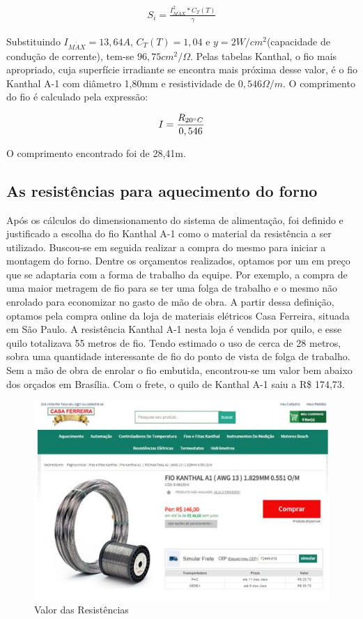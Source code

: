 \begin{align}
S_i = \frac{I_{M\acute{A}X}^{2}*C_T(T)}{\gamma}
\end{align}

Substituindo $I_{M\acute{A}X}=13,64A$, $C_T(T)=1,04$ e $y=2W/cm^{2}$(capacidade de condução de corrente), tem-se $96,75 cm^{2} / \Omega$. Pelas tabelas Kanthal, o fio mais apropriado, cuja superfície irradiante se encontra mais próxima desse valor, é o fio Kanthal A-1 com diâmetro 1,80mm e resistividade de $0,546\Omega /m$. O comprimento do fio é calculado pela expressão:

\begin{align}
I= \frac{R_{20 \degree C}}{0,546}
\end{align}

O comprimento encontrado foi de 28,41m.

\subsection{As resistências para aquecimento do forno}

Após os cálculos do dimensionamento do sistema de alimentação, foi definido e justificado a escolha do fio Kanthal A-1 como o material da resistência a ser utilizado.
Buscou-se em seguida realizar a compra do mesmo para iniciar a montagem do forno. Dentre os orçamentos realizados, optamos por um em preço que se adaptaria com a forma de trabalho da equipe. Por exemplo, a compra de uma maior metragem de fio para se ter uma folga de trabalho e o mesmo não enrolado para economizar no gasto de mão de obra.
A partir dessa definição, optamos pela compra online da loja de materiais elétricos Casa Ferreira, situada em São Paulo. A resistência Kanthal A-1 nesta loja é vendida por quilo, e esse quilo totalizava 55 metros de fio. Tendo estimado o uso de cerca de 28 metros, sobra uma quantidade interessante de fio do ponto de vista de folga de trabalho. Sem a mão de obra de enrolar o fio embutida, encontrou-se um valor bem abaixo dos orçados em Brasília. Com o frete, o quilo de Kanthal A-1 saiu a R\$ 174,73.


\begin{figure}[!h]
	\centering
	\label{resistencia1}
	\includegraphics[keepaspectratio=true,scale=1.0]{figuras/alimentacao1.JPG}
	\caption{Valor das Resistências}
\end{figure}

